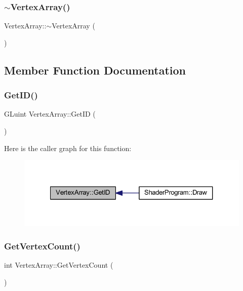 \subsubsection{\texorpdfstring{$\sim$\+Vertex\+Array()}{~VertexArray()}}
{\footnotesize\ttfamily Vertex\+Array\+::$\sim$\+Vertex\+Array (\begin{DoxyParamCaption}{ }\end{DoxyParamCaption})}



\subsection{Member Function Documentation}
\mbox{\label{class_vertex_array_ab5d3887c2b7ab5fa779cda481f776c98}} 
\subsubsection{\texorpdfstring{Get\+I\+D()}{GetID()}}
{\footnotesize\ttfamily G\+Luint Vertex\+Array\+::\+Get\+ID (\begin{DoxyParamCaption}{ }\end{DoxyParamCaption})}

Here is the caller graph for this function\+:
\nopagebreak
\begin{figure}[H]
\begin{center}
\leavevmode
\includegraphics[width=327pt]{class_vertex_array_ab5d3887c2b7ab5fa779cda481f776c98_icgraph}
\end{center}
\end{figure}
\mbox{\label{class_vertex_array_a94f9ebffa24c5721783099fef186f9a0}} 
\subsubsection{\texorpdfstring{Get\+Vertex\+Count()}{GetVertexCount()}}
{\footnotesize\ttfamily int Vertex\+Array\+::\+Get\+Vertex\+Count (\begin{DoxyParamCaption}{ }\end{DoxyParamCaption})}

